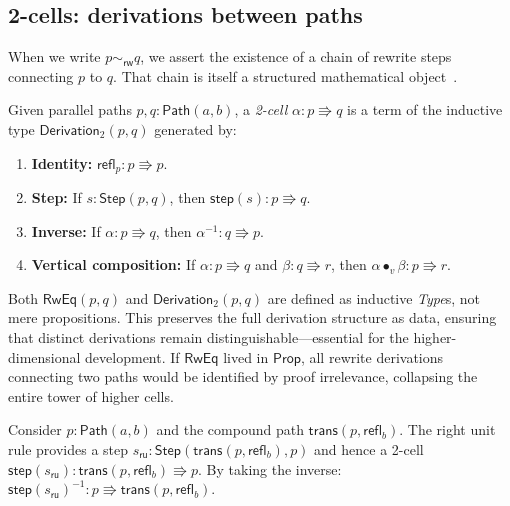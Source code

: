 \documentclass[manuscript]{BSLstyle}
\newcommand{\Path}{\mathsf{Path}}
\newcommand{\refl}{\mathsf{refl}}
\newcommand{\trans}{\mathsf{trans}}
\newcommand{\Prop}{\mathsf{Prop}}
\newcommand{\Step}{\mathsf{Step}}
\newcommand{\RwEq}{\mathsf{RwEq}}
\newcommand{\rweq}{\sim_{\mathsf{rw}}}
\begin{document}
\subsection{2-cells: derivations between paths}

When we write $p \rweq q$, we assert the existence of a chain of rewrite
steps connecting $p$ to $q$.  That chain is itself a structured
mathematical object~\cite{RamosDeQueirozDeOliveira2014,RamosDeQueirozDeOliveira2016}.

\begin{definition}[2-cell]\label{def:2cell}
Given parallel paths $p, q : \Path(a, b)$, a \emph{2-cell}
$\alpha : p \Rrightarrow q$ is a term of the inductive type
$\mathsf{Derivation}_2(p, q)$ generated by:
\begin{enumerate}[label=(\roman*)]
\item \textbf{Identity:} $\refl_p : p \Rrightarrow p$.
\item \textbf{Step:} If $s : \Step(p, q)$, then
  $\mathsf{step}(s) : p \Rrightarrow q$.
\item \textbf{Inverse:} If $\alpha : p \Rrightarrow q$, then
  $\alpha^{-1} : q \Rrightarrow p$.
\item \textbf{Vertical composition:} If $\alpha : p \Rrightarrow q$
  and $\beta : q \Rrightarrow r$, then
  $\alpha \bullet_v \beta : p \Rrightarrow r$.
\end{enumerate}
\end{definition}

\begin{remark}
Both $\RwEq(p,q)$ and $\mathsf{Derivation}_2(p,q)$ are defined as
inductive \emph{Type}s, not mere propositions.  This preserves the full
derivation structure as data, ensuring that distinct derivations remain
distinguishable---essential for the higher-dimensional development.
If $\RwEq$ lived in $\Prop$, all rewrite derivations connecting two
paths would be identified by proof irrelevance, collapsing the entire
tower of higher cells.
\end{remark}

\begin{example}\label{ex:2cell-unit}
Consider $p : \Path(a, b)$ and the compound path $\trans(p, \refl_b)$.
The right unit rule provides a step
$s_{\mathsf{ru}} : \Step(\trans(p, \refl_b), p)$
and hence a 2-cell
$\mathsf{step}(s_{\mathsf{ru}}) : \trans(p, \refl_b) \Rrightarrow p$.
By taking the inverse:
$\mathsf{step}(s_{\mathsf{ru}})^{-1} : p \Rrightarrow \trans(p, \refl_b)$.
\end{example}
\end{document}
